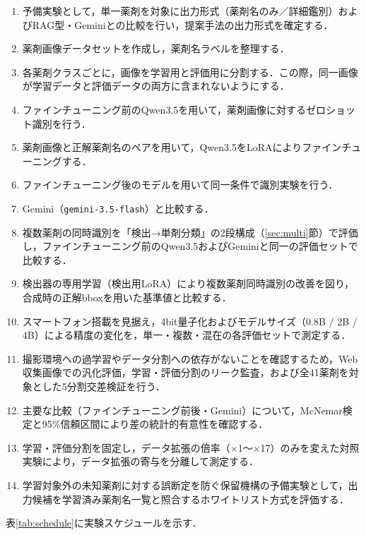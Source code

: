 \documentclass[dvipdfmx]{jsarticle}
\begin{document}
\begin{enumerate}
  \item 予備実験として，単一薬剤を対象に出力形式（薬剤名のみ／詳細鑑別）およびRAG型・Geminiとの比較を行い，提案手法の出力形式を確定する．
  \item 薬剤画像データセットを作成し，薬剤名ラベルを整理する．
  \item 各薬剤クラスごとに，画像を学習用と評価用に分割する．この際，同一画像が学習データと評価データの両方に含まれないようにする．
  \item ファインチューニング前のQwen3.5を用いて，薬剤画像に対するゼロショット識別を行う．
  \item 薬剤画像と正解薬剤名のペアを用いて，Qwen3.5をLoRAによりファインチューニングする．
  \item ファインチューニング後のモデルを用いて同一条件で識別実験を行う．
  \item Gemini（\texttt{gemini-3.5-flash}）と比較する．
  \item 複数薬剤の同時識別を「検出→単剤分類」の2段構成（\ref{sec:multi}節）で評価し，ファインチューニング前のQwen3.5およびGeminiと同一の評価セットで比較する．
  \item 検出器の専用学習（検出用LoRA）により複数薬剤同時識別の改善を図り，合成時の正解bboxを用いた基準値と比較する．
  \item スマートフォン搭載を見据え，4bit量子化およびモデルサイズ（0.8B / 2B / 4B）による精度の変化を，単一・複数・混在の各評価セットで測定する．
  \item 撮影環境への過学習やデータ分割への依存がないことを確認するため，Web収集画像での汎化評価，学習・評価分割のリーク監査，および全41薬剤を対象とした5分割交差検証を行う．
  \item 主要な比較（ファインチューニング前後・Gemini）について，McNemar検定と95\%信頼区間により差の統計的有意性を確認する．
  \item 学習・評価分割を固定し，データ拡張の倍率（$\times$1〜$\times$17）のみを変えた対照実験により，データ拡張の寄与を分離して測定する．
  \item 学習対象外の未知薬剤に対する誤断定を防ぐ保留機構の予備実験として，出力候補を学習済み薬剤名一覧と照合するホワイトリスト方式を評価する．
\end{enumerate}

表\ref{tab:schedule}に実験スケジュールを示す．
\end{document}
